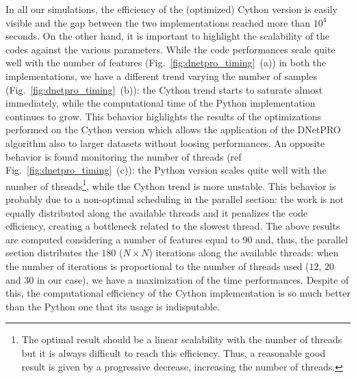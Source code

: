 \documentclass{standalone}
\begin{document}
In all our simulations, the efficiency of the (optimized) \textsf{Cython} version is easily visible and the gap between the two implementations reached more than $10^4$ seconds.
On the other hand, it is important to highlight the scalability of the codes against the various parameters.
While the code performances scale quite well with the number of features (Fig.~\ref{fig:dnetpro_timing}~(a)) in both the implementations, we have a different trend varying the number of samples (Fig.~\ref{fig:dnetpro_timing}~(b)): the \textsf{Cython} trend starts to saturate almost immediately, while the computational time of the \textsf{Python} implementation continues to grow.
This behavior highlights the results of the optimizations performed on the \textsf{Cython} version which allows the application of the \textsf{DNetPRO} algorithm also to larger datasets without loosing performances.
An opposite behavior is found monitoring the number of threads (ref Fig.~\ref{fig:dnetpro_timing}~(c)): the \textsf{Python} version scales quite well with the number of threads\footnote{
  The optimal result should be a linear scalability with the number of threads but it is always difficult to reach this efficiency.
  Thus, a reasonable good result is given by a progressive decrease, increasing the number of threads.
}, while the \textsf{Cython} trend is more unstable.
This behavior is probably due to a non-optimal scheduling in the parallel section: the work is not equally distributed along the available threads and it penalizes the code efficiency, creating a bottleneck related to the slowest thread.
The above results are computed considering a number of features equal to $90$ and, thus, the parallel section distributes the $180$ ($N\times N$) iterations along the available threads: when the number of iterations is proportional to the number of threads used ($12$, $20$ and $30$ in our case), we have a maximization of the time performances.
Despite of this, the computational efficiency of the \textsf{Cython} implementation is so much better than the \textsf{Python} one that its usage is indisputable.
\end{document}

